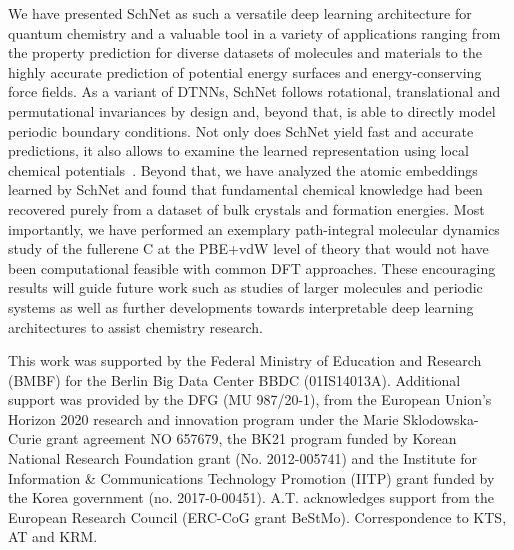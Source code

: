 \documentclass[aip,jcp,reprint,graphicx]{revtex4-1}
\begin{document}
We have presented SchNet as such a versatile deep learning architecture for quantum chemistry and a valuable tool in a variety of applications ranging from the property prediction for diverse datasets of molecules and materials to the highly accurate prediction of potential energy surfaces and energy-conserving force fields.
As a variant of DTNNs, SchNet follows rotational, translational and permutational invariances by design and, beyond that, is able to directly model periodic boundary conditions.
Not only does SchNet yield fast and accurate predictions, it also allows to examine the learned representation using local chemical potentials~\citep{schutt2017quantum}.
Beyond that, we have analyzed the atomic embeddings learned by SchNet and found that fundamental chemical knowledge had been recovered purely from a dataset of bulk crystals and formation energies.
Most importantly, we have performed an exemplary path-integral molecular dynamics study of the fullerene C at the PBE+vdW level of theory that would not have been computational feasible with common DFT approaches. 
These encouraging results will guide future work such as studies of larger molecules and periodic systems as well as further developments towards interpretable deep learning architectures to assist chemistry research.


\begin{acknowledgments}
This work was supported by the Federal Ministry of Education and Research (BMBF) for the Berlin Big Data Center BBDC (01IS14013A). Additional support was provided by the DFG (MU 987/20-1), from the European Union's Horizon 2020 research and innovation program under the Marie Sklodowska-Curie grant agreement NO 657679, the BK21 program funded by Korean National Research Foundation grant (No. 2012-005741) and the Institute for Information \& Communications Technology Promotion (IITP) grant funded by the Korea government (no. 2017-0-00451). A.T. acknowledges support from the European Research Council (ERC-CoG grant BeStMo). Correspondence to KTS, AT and KRM.
\end{acknowledgments}

\appendix
\end{document}
